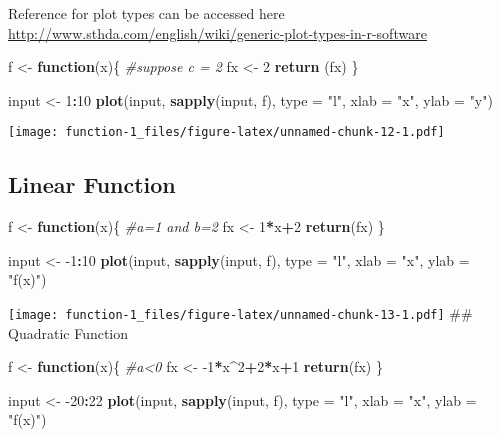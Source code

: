 \documentclass[
]{article}
\newenvironment{Shaded}{\begin{snugshade}}{\end{snugshade}}
\newcommand{\CommentTok}[1]{\textcolor[rgb]{0.56,0.35,0.01}{\textit{#1}}}
\newcommand{\ControlFlowTok}[1]{\textcolor[rgb]{0.13,0.29,0.53}{\textbf{#1}}}
\newcommand{\DataTypeTok}[1]{\textcolor[rgb]{0.13,0.29,0.53}{#1}}
\newcommand{\DecValTok}[1]{\textcolor[rgb]{0.00,0.00,0.81}{#1}}
\newcommand{\KeywordTok}[1]{\textcolor[rgb]{0.13,0.29,0.53}{\textbf{#1}}}
\newcommand{\NormalTok}[1]{#1}
\newcommand{\OperatorTok}[1]{\textcolor[rgb]{0.81,0.36,0.00}{\textbf{#1}}}
\newcommand{\StringTok}[1]{\textcolor[rgb]{0.31,0.60,0.02}{#1}}
\begin{document}
Reference for plot types can be accessed here
\url{http://www.sthda.com/english/wiki/generic-plot-types-in-r-software}

\begin{Shaded}
\begin{Highlighting}[]
\NormalTok{f <-}\StringTok{ }\ControlFlowTok{function}\NormalTok{(x)\{}
  \CommentTok{#suppose c = 2}
\NormalTok{  fx <-}\StringTok{ }\DecValTok{2}
  \KeywordTok{return}\NormalTok{ (fx)}
\NormalTok{\}}

\NormalTok{input <-}\StringTok{ }\DecValTok{1}\OperatorTok{:}\DecValTok{10}
\KeywordTok{plot}\NormalTok{(input, }\KeywordTok{sapply}\NormalTok{(input, f), }\DataTypeTok{type =} \StringTok{"l"}\NormalTok{, }\DataTypeTok{xlab =} \StringTok{"x"}\NormalTok{, }\DataTypeTok{ylab =} \StringTok{"y"}\NormalTok{)}
\end{Highlighting}
\end{Shaded}

\texttt{[image: function-1\_files/figure-latex/unnamed-chunk-12-1.pdf]}

\hypertarget{linear-function}{%
\subsection{Linear Function}\label{linear-function}}

\begin{Shaded}
\begin{Highlighting}[]
\NormalTok{f <-}\StringTok{ }\ControlFlowTok{function}\NormalTok{(x)\{}
  \CommentTok{#a=1 and b=2}
\NormalTok{  fx <-}\StringTok{ }\DecValTok{1}\OperatorTok{*}\NormalTok{x}\OperatorTok{+}\DecValTok{2}
  \KeywordTok{return}\NormalTok{(fx)}
\NormalTok{\}}

\NormalTok{input <-}\StringTok{ }\DecValTok{-1}\OperatorTok{:}\DecValTok{10}
\KeywordTok{plot}\NormalTok{(input, }\KeywordTok{sapply}\NormalTok{(input, f), }\DataTypeTok{type =} \StringTok{"l"}\NormalTok{, }\DataTypeTok{xlab =} \StringTok{"x"}\NormalTok{, }\DataTypeTok{ylab =} \StringTok{"f(x)"}\NormalTok{)}
\end{Highlighting}
\end{Shaded}

\texttt{[image: function-1\_files/figure-latex/unnamed-chunk-13-1.pdf]}
\#\# Quadratic Function

\begin{Shaded}
\begin{Highlighting}[]
\NormalTok{f <-}\StringTok{ }\ControlFlowTok{function}\NormalTok{(x)\{}
  \CommentTok{#a<0}
\NormalTok{  fx <-}\StringTok{ }\DecValTok{-1}\OperatorTok{*}\NormalTok{x}\OperatorTok{^}\DecValTok{2}\OperatorTok{+}\DecValTok{2}\OperatorTok{*}\NormalTok{x}\OperatorTok{+}\DecValTok{1}
  \KeywordTok{return}\NormalTok{(fx)}
\NormalTok{\}}

\NormalTok{input <-}\StringTok{ }\DecValTok{-20}\OperatorTok{:}\DecValTok{22}
\KeywordTok{plot}\NormalTok{(input, }\KeywordTok{sapply}\NormalTok{(input, f), }\DataTypeTok{type =} \StringTok{"l"}\NormalTok{, }\DataTypeTok{xlab =} \StringTok{"x"}\NormalTok{, }\DataTypeTok{ylab =} \StringTok{"f(x)"}\NormalTok{)}
\end{Highlighting}
\end{Shaded}
\end{document}
